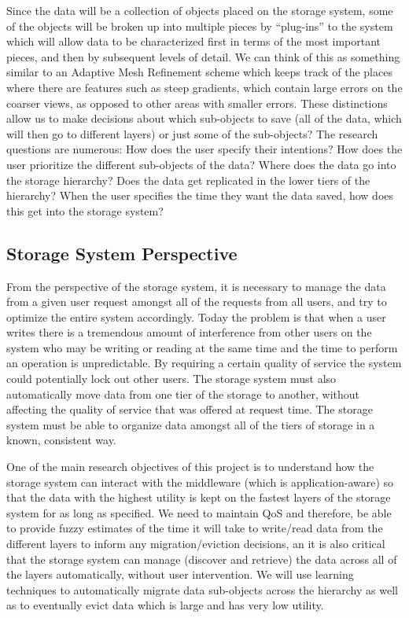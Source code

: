 Since the data will be a collection of objects placed on the storage system,
some of the objects will be broken up into multiple pieces by ``plug-ins''
to the system which will allow data to be characterized first in terms of the most
important pieces, and then by subsequent levels of detail. We can think of this as
something similar to an Adaptive Mesh Refinement scheme which keeps track of
the places where there are features such as steep gradients, which contain large errors on the
coarser views, as opposed to other areas with smaller errors. These distinctions allow us to make decisions
about which sub-objects to save (all of the data, which will then go to
different layers) or just some of the sub-objects? The research questions
are numerous: How does the user specify their intentions? How does the user
prioritize the different sub-objects of the data? Where does the data go
into the storage hierarchy? Does the data get replicated in the lower tiers
of the hierarchy? When the user specifies the time they want the data saved,
how does this get into the storage system?

\subsection{Storage System Perspective}
\label{subsec:storage-perspective}
From the perspective of the storage system, it is necessary to manage the data from
a given user request amongst all of the requests from all users, and try to optimize the
entire system accordingly. Today the problem is that when a user writes there is a
tremendous amount of interference from other users on the system who may be
writing or reading at the same time and the time to perform an operation is unpredictable. 
By requiring a certain quality of service the system could potentially lock out other users. 
The storage system must also automatically move data from one tier of the storage to
another, without affecting the quality of service that was offered at request
time. The storage system must be able to organize
data amongst all of the tiers of storage in a known, consistent way.

One of the main research objectives of this project is to understand how the
storage system can interact with the middleware (which is application-aware)  so
that the data with the highest utility is kept on the fastest layers of the
storage system for as long as specified. We need to maintain 
QoS and therefore, be able to provide fuzzy estimates of the time it will take to write/read data from
the different layers to inform any migration/eviction decisions, an it
is also critical that the storage system can manage (discover and retrieve) the data across all of the
layers automatically, without user intervention. We will use learning techniques to automatically migrate data
sub-objects across the hierarchy as well as to eventually evict data which is
large and has very low utility.


